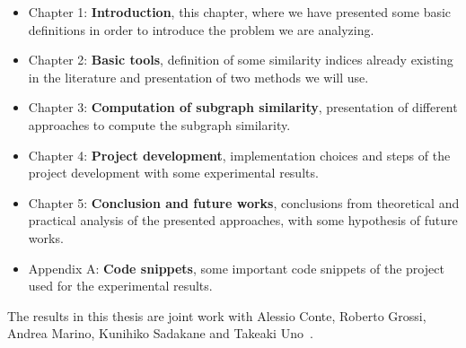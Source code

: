 \begin{itemize}
	\item Chapter 1: \textbf{Introduction}, this chapter, where we have presented some basic definitions in order to introduce the problem we are analyzing.
	
	\item Chapter 2: \textbf{Basic tools}, definition of some similarity indices already existing in the literature and presentation of two methods we will use.
	
	\item Chapter 3: \textbf{Computation of subgraph similarity}, presentation of different approaches to compute the subgraph similarity.
	
	\item Chapter 4: \textbf{Project development}, implementation choices and steps of the project development with some experimental results.
	
	\item Chapter 5: \textbf{Conclusion and future works}, conclusions from theoretical and practical analysis of the presented approaches, with some hypothesis of future works.
	
	\item Appendix A: \textbf{Code snippets}, some important code snippets of the project used for the experimental results.
\end{itemize}

The results in this thesis are joint work with Alessio Conte, Roberto Grossi, Andrea Marino, Kunihiko Sadakane and Takeaki Uno~\cite{SubSim}.